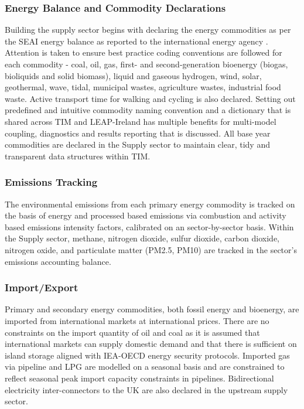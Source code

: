 \documentclass[journal abbreviation, manuscript]{copernicus}
\begin{document}
\subsubsection{Energy Balance and Commodity Declarations}
Building the supply sector begins with declaring the energy commodities as per the SEAI energy balance as reported to the international energy agency \citep{SEAI2019}. Attention is taken to ensure best practice coding conventions are followed for each commodity - coal, oil, gas, first- and second-generation bioenergy (biogas, bioliquids and solid biomass), liquid and gaseous hydrogen, wind, solar, geothermal, wave, tidal, municipal wastes, agriculture wastes, industrial food waste. Active transport time for walking and cycling is also declared. Setting out predefined and intuitive commodity naming convention and a dictionary that is shared across TIM and LEAP-Ireland has multiple benefits for multi-model coupling, diagnostics and results reporting that is discussed. All base year commodities are declared in the Supply sector to maintain clear, tidy and transparent data structures within TIM.

\subsubsection{Emissions Tracking}
The environmental emissions from each primary energy commodity is tracked on the basis of energy and processed based emissions via combustion and activity based emissions intensity factors, calibrated on an sector-by-sector basis. Within the Supply sector, methane, nitrogen dioxide, sulfur dioxide, carbon dioxide, nitrogen oxide, and particulate matter (PM2.5, PM10) are tracked in the sector's emissions accounting balance.

\subsubsection{Import/Export}
Primary and secondary energy commodities, both fossil energy and bioenergy, are imported from international markets at international prices. There are no constraints on the import quantity of oil and coal as it is assumed that international markets can supply domestic demand and that there is sufficient on island storage aligned with IEA-OECD energy security protocols. Imported gas via pipeline and LPG are modelled on a seasonal basis and are constrained to reflect seasonal peak import capacity constraints in pipelines. Bidirectional electricity inter-connectors to the UK are also declared in the upstream supply sector.
\end{document}
